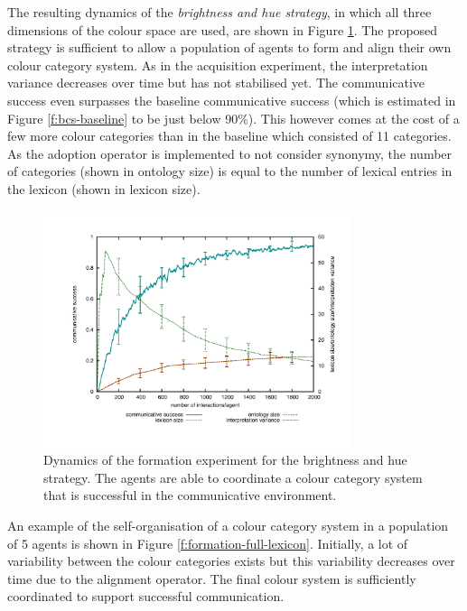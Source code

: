The resulting dynamics of the \emph{brightness and hue strategy}, in
which all three dimensions of the colour space are used, are shown in
Figure \ref{f:formation-full-dynamics}. The proposed strategy is
sufficient to allow a population of agents to form and align their own
colour category system. As in the acquisition experiment, the
interpretation variance decreases over time but has not stabilised
yet. The communicative success even surpasses the baseline
communicative success (which is estimated in Figure
\ref{f:bcs-baseline} to be just below 90\%). This however comes at the
cost of a few more colour categories than in the baseline which
consisted of 11 categories. As the adoption operator is implemented to
not consider synonymy, the number of categories (shown in ontology
size) is equal to the number of lexical entries in the lexicon (shown
in lexicon size).

\begin{figure}[htpb]
  \begin{center}
    \includegraphics[width=0.8\textwidth]{./basic-operators/figures/formation-full.pdf}
    \caption[Dynamics of the formation experiment for the brightness
    and hue strategy]{Dynamics of the formation experiment for the
      brightness and hue strategy. The agents are able to coordinate a
      colour category system that is successful in the communicative
      environment.}
    \label{f:formation-full-dynamics}
  \end{center}
\end{figure}

An example of the self-organisation of a colour category system in a
population of 5 agents is shown in Figure
\ref{f:formation-full-lexicon}. Initially, a lot of variability
between the colour categories exists but this variability decreases
over time due to the alignment operator. The final colour system is
sufficiently coordinated to support successful communication.

